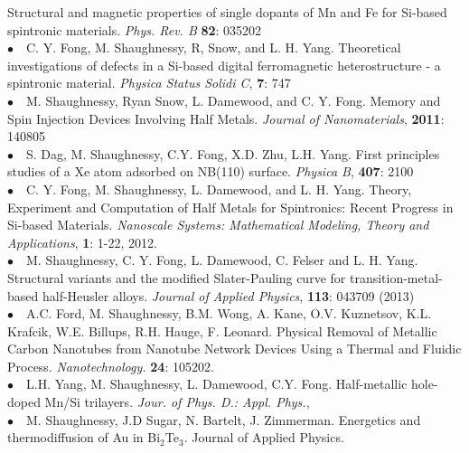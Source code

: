 \documentclass[11pt, a4paper]{article}
\newcommand{\years}[1]{\marginnote{\scriptsize #1}}
\begin{document}
{Structural and magnetic properties of single dopants of Mn and Fe for Si-based spintronic materials.} \emph{Phys. Rev. B} \textbf{82}: 035202 \\
\years{    }$\bullet$\ \   C. Y. Fong, M. Shaughnessy, R, Snow, and L. H. Yang. %
{Theoretical investigations of defects in a Si-based digital ferromagnetic heterostructure - a spintronic material.} \emph{Physica Status Solidi C}, \textbf{7}: 747\\
\years{2011}$\bullet$\ \   M. Shaughnessy, Ryan Snow, L. Damewood, and C. Y. Fong. %
{Memory and Spin Injection Devices Involving Half Metals.} \emph{Journal of Nanomaterials}, \textbf{2011}: 140805\\
\years{2012}$\bullet$\ \   S. Dag, M. Shaughnessy, C.Y. Fong, X.D. Zhu, L.H. Yang. %
{First principles studies of a Xe atom adsorbed on NB(110) surface.} \emph{Physica B}, \textbf{407}: 2100 \\
\years{    }$\bullet$\ \   C. Y. Fong, M. Shaughnessy, L. Damewood, and L. H. Yang. %
{Theory, Experiment and Computation of Half Metals for Spintronics: Recent Progress in Si-based Materials.} \emph{Nanoscale Systems: Mathematical Modeling, Theory and Applications},  \textbf{1}: 1-22,  2012. \\
\years{2013}$\bullet$\ \   M. Shaughnessy, C. Y. Fong, L. Damewood, C. Felser and L. H. Yang. %
{Structural variants and the modified Slater-Pauling curve for transition-metal-based half-Heusler alloys.} \emph{Journal of Applied Physics}, \textbf{113}: 043709 (2013) \\
\years{    } $\bullet$\ \   A.C. Ford, M. Shaughnessy, B.M. Wong, A. Kane, O.V. Kuznetsov, K.L. Krafcik, W.E. Billups, R.H. Hauge, F. Leonard. %
{Physical Removal of Metallic Carbon Nanotubes from Nanotube Network Devices Using a Thermal and Fluidic Process.} \emph{Nanotechnology.} \textbf{24}: 105202. \\
\years{    }$\bullet$\ \    L.H. Yang, M. Shaughnessy, L. Damewood, C.Y. Fong. %
{Half-metallic hole-doped Mn/Si trilayers.} 
\emph{Jour. of Phys. D.: Appl. Phys.}, \\
\years{2014}$\bullet$\ \   M. Shaughnessy, J.D Sugar, N. Bartelt, J. Zimmerman. {Energetics and thermodiffusion of Au in Bi$_2$Te$_3$.} Journal of Applied Physics.
\end{document}
